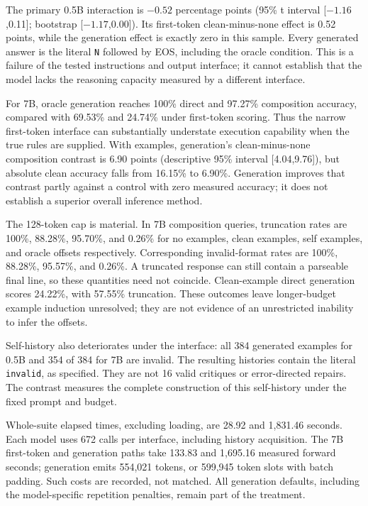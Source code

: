 \documentclass[11pt]{article}
\begin{document}
The primary 0.5B interaction is $-0.52$ percentage points (95\% t interval
[$-1.16$,0.11]; bootstrap [$-1.17$,0.00]). Its first-token clean-minus-none
effect is 0.52 points, while the generation effect is exactly zero in this
sample. Every generated answer is the literal \texttt{N} followed by EOS,
including the oracle condition. This is a failure of the tested instructions
and output interface; it cannot establish that the model lacks the reasoning
capacity measured by a different interface.

For 7B, oracle generation reaches 100\% direct and 97.27\% composition
accuracy, compared with 69.53\% and 24.74\% under first-token scoring. Thus the
narrow first-token interface can substantially understate execution capability
when the true rules are supplied. With examples, generation's clean-minus-none
composition contrast is 6.90 points (descriptive 95\% interval [4.04,9.76]),
but absolute clean accuracy falls from 16.15\% to 6.90\%. Generation improves
that contrast partly against a control with zero measured accuracy; it does
not establish a superior overall inference method.

The 128-token cap is material. In 7B composition queries, truncation rates are
100\%, 88.28\%, 95.70\%, and 0.26\% for no examples, clean examples, self
examples, and oracle offsets respectively. Corresponding invalid-format rates
are 100\%, 88.28\%, 95.57\%, and 0.26\%. A truncated response can still contain
a parseable final line, so these quantities need not coincide. Clean-example
direct generation scores 24.22\%, with 57.55\% truncation. These outcomes
leave longer-budget example induction unresolved; they are not evidence of an
unrestricted inability to infer the offsets.

Self-history also deteriorates under the interface: all 384 generated examples
for 0.5B and 354 of 384 for 7B are invalid. The resulting histories contain the
literal \texttt{invalid}, as specified. They are not 16 valid critiques or
error-directed repairs. The contrast measures the complete construction of this
self-history under the fixed prompt and budget.

Whole-suite elapsed times, excluding loading, are 28.92 and 1,831.46 seconds.
Each model uses 672 calls per interface, including history acquisition. The 7B
first-token and generation paths take 133.83 and 1,695.16 measured forward
seconds; generation emits 554,021 tokens, or 599,945 token slots with batch
padding. Such costs are recorded, not matched. All generation defaults,
including the model-specific repetition penalties, remain part of the treatment.
\end{document}
